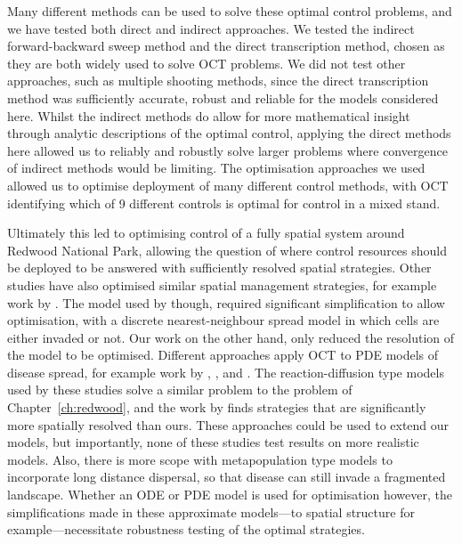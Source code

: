 Many different methods can be used to solve these optimal control problems, and we have tested both direct and indirect approaches. We tested the indirect forward-backward sweep method and the direct transcription method, chosen as they are both widely used to solve OCT problems. We did not test other approaches, such as multiple shooting methods, since the direct transcription method was sufficiently accurate, robust and reliable for the models considered here. Whilst the indirect methods do allow for more mathematical insight through analytic descriptions of the optimal control, applying the direct methods here allowed us to reliably and robustly solve larger problems where convergence of indirect methods would be limiting. The optimisation approaches we used allowed us to optimise deployment of many different control methods, with OCT identifying which of 9 different controls is optimal for control in a mixed stand.

Ultimately this led to optimising control of a fully spatial system around Redwood National Park, allowing the question of where control resources should be deployed to be answered with sufficiently resolved spatial strategies. Other studies have also optimised similar spatial management strategies, for example work by \citet{epanchin_optimal_2012}. The model used by \citet{epanchin_optimal_2012} though, required significant simplification to allow optimisation, with a discrete nearest-neighbour spread model in which cells are either invaded or not. Our work on the other hand, only reduced the resolution of the model to be optimised. Different approaches apply OCT to PDE models of disease spread, for example work by \citet{neilan_optimal_2011}, \citet{christley_optimal_2016}, and \citet{miyaoka_optimal_2019}. The reaction-diffusion type models used by these studies solve a similar problem to the problem of Chapter~\ref{ch:redwood}, and the work by \citet{miyaoka_optimal_2019} finds strategies that are significantly more spatially resolved than ours. These approaches could be used to extend our models, but importantly, none of these studies test results on more realistic models. Also, there is more scope with metapopulation type models to incorporate long distance dispersal, so that disease can still invade a fragmented landscape. Whether an ODE or PDE model is used for optimisation however, the simplifications made in these approximate models---to spatial structure for example---necessitate robustness testing of the optimal strategies.

